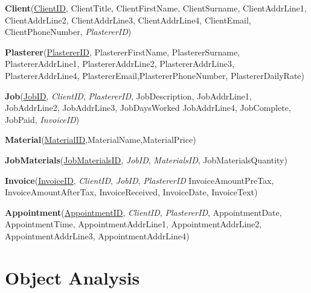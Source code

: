 \begin{center}
	\textbf{Client}(\underline{ClientID}, ClientTitle, ClientFirstName, ClientSurname, ClientAddrLine1, ClientAddrLine2, ClientAddrLine3, ClientAddrLine4, ClientEmail, ClientPhoneNumber, \emph{PlastererID})
\end{center}



\begin{center}
	\textbf{Plasterer}(\underline{PlastererID}, PlastererFirstName, PlastererSurname, PlastererAddrLine1, PlastererAddrLine2, PlastererAddrLine3, PlastererAddrLine4, PlastererEmail,PlastererPhoneNumber, PlastererDailyRate)
\end{center}



\begin{center}
\textbf{Job}(\underline{JobID}, \emph{ClientID}, \emph{PlastererID}, JobDescription, JobAddrLine1, JobAddrLine2, JobAddrLine3, JobDaysWorked JobAddrLine4, JobComplete, JobPaid, \emph{InvoiceID})
\end{center}


\begin{center}
\textbf{Material}(\underline{MaterialID},MaterialName,MaterialPrice)
\end{center}


\begin{center}
\textbf{JobMaterials}(\underline{JobMaterialsID}, \emph{JobID}, \emph{MaterialsID}, JobMaterialsQuantity)
\end{center}


\begin{center}
\textbf{Invoice}(\underline{InvoiceID}, \emph{ClientID}, \emph{JobID}, \emph{PlastererID} InvoiceAmountPreTax, InvoiceAmountAfterTax, InvoiceReceived, InvoiceDate, InvoiceText)
\end{center}



\begin{center}
\textbf{Appointment}(\underline{AppointmentID}, \emph{ClientID}, \emph{PlastererID}, AppointmentDate, AppointmentTime, AppointmentAddrLine1, AppointmentAddrLine2, AppointmentAddrLine3, AppointmentAddrLine4)
\end{center}



\section{Object Analysis}

